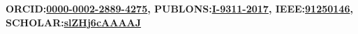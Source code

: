 \documentclass[mm,10pt,a4paper]{simple_style}
\newcommand{\MyLinks}{\noindent
\textbf{ORCID:\href{http://orcid.org/0000-0002-2889-4275}{0000-0002-2889-4275}, \hfill
PUBLONS:\href{https://publons.com/researcher/I-9311-2017}{I-9311-2017}, \hfill
IEEE:\href{https://ieeexplore.ieee.org/author/37086581106}{91250146}, \hfill
SCHOLAR:\href{https://scholar.google.co.in/citations?user=slZHj6cAAAAJ}{slZHj6cAAAAJ}\ }}
\begin{document}
\begin{resume}
\fullline
\small{\hspace*{-10.2em}\MyLinks} \\
\vspace{-1em}
\sectionline


%










\end{resume}
\nocite{*}
\end{document}
